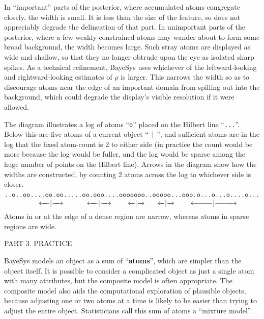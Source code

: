 In ``important'' parts of the posterior, where accumulated atoms congregate closely, the width is small.
It is less than the size of the feature, so does not appreciably degrade the delineation of that part.
In unimportant parts of the posterior, where a few weakly-constrained atoms may wander about to form some broad background, the width becomes large.
Such stray atoms are displayed as wide and shallow, so that they no longer obtrude upon the eye as isolated sharp spikes.
As a technical refinement, BayeSys uses whichever of the leftward-looking and rightward-looking estimates of $\rho$ is larger.
This narrows the width so as to discourage atoms near the edge of an important domain from spilling out into the background,
which could degrade the display's visible resolution if it were allowed.

The diagram illustrates a log of atoms ``{\tt o}'' placed on the Hilbert line ``{\tt ...}''.
Below this are five atoms of a current object ``$\,\mid\,$'', 
and sufficient atoms are in the log that the fixed atom-count is 2 to either side
(in practice the count would be more because the log would be fuller, and the log would be sparse among the huge number of points on the Hilbert line).
Arrows in the diagram show how the widths are constructed, by counting 2 atoms across the log to whichever side is closer.
$$
\vbox{
      \hbox{\tt ..o..oo....oo.oo.....oo.ooo....ooooooo..ooooo...ooo.o...o...o....o...}
      \hbox{
            \hskip 45.4pt    \hbox to 16.0pt{\leftarrowfill} $\!\!\mid\!\!$ \hbox to 16.0pt{\rightarrowfill}
            \hskip 30.3pt    \hbox to 16.0pt{\leftarrowfill} $\!\!\mid\!\!$ \hbox to 16.0pt{\rightarrowfill}
            \hskip 20.0pt    \hbox to 10.5pt{\leftarrowfill} $\!\!\mid\!\!$ \hbox to 10.5pt{\rightarrowfill}
            \hskip 15.0pt    \hbox to 10.5pt{\leftarrowfill} $\!\!\mid\!\!$ \hbox to 10.5pt{\rightarrowfill}
            \hskip 19.8pt    \hbox to 31.5pt{\leftarrowfill} $\!\!\mid\!\!$ \hbox to 31.5pt{\rightarrowfill}}
     }
$$
Atoms in or at the edge of a dense region are narrow, whereas atoms in sparse regions are wide.

\vfill\eject

\centerline{\bigger PART 3. PRACTICE}
\bigskip
{}
\bigskip

BayeSys models an object as a sum of ``{\bf atoms}'', which are simpler than the object itself.  
It is possible to consider a complicated object as just a single atom with many attributes, but the composite model is often appropriate.  
The composite model also aids the computational exploration of plausible objects, 
because adjusting one or two atoms at a time is likely to be easier than trying to adjust the entire object.  
Statisticians call this sum of atoms a ``mixture model''.

